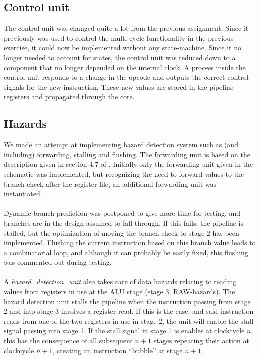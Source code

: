 \subsection{Control unit}
The control unit was changed quite a lot from the previous assignment. Since it
previously was used to control the multi-cycle functionality in the previous
exercise, it could now be implemented without any state-machine. Since it no
longer needed to account for states, the control unit was reduced down to a
component that no longer depended on the internal clock. A process inside the
control unit responds to a change in the opcode and outputs the correct control
signals for the new instruction. These new values are stored in the pipeline
registers and propagated through the core.

\subsection{Hazards}
We made an attempt at implementing hazard detection system such as (and
including) forwarding, stalling and flushing. The forwarding unit is based on
the description given in section 4.7 of \cite{patterson12}. Initially only the
forwarding unit given in the schematic was implemented, but recognizing the
need to forward values to the branch check after the register file, an
additional forwarding unit was instantiated.
\paragraph*{}
Dynamic branch prediction was postponed to give more time for testing, and
branches are in the design assumed to fall through. If this fails, the pipeline
is stalled, but the optimization of moving the branch check to stage 2 has been
implemented. Flushing the current instruction based on this branch value leads
to a combinatorial loop, and although it can probably be easily fixed, this
flushing was commented out during testing.
\paragraph*{}
A \emph{hazard\_detection\_unit} also takes care of data hazards relating to
reading values from registers in use at the ALU stage (stage 3, RAW-hazards).
The hazard detection unit stalls the pipeline when the instruction passing from
stage 2 and into stage 3 involves a register read. If this is the case, and said
instruction reads from one of the two registers in use in stage 2, the unit will
enable the stall signal passing into stage 1. If the stall signal in stage 1 is
enables at clockcycle $n$, this has the consequence of all subsequent $n+1$
stages repeating their action at clockcycle $n+1$, creating an instruction
``bubble'' at stage $n+1$.
